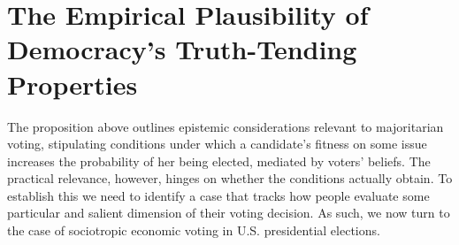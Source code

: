 \documentclass[11pt]{article}
\begin{document}
\section{The Empirical Plausibility of Democracy's Truth-Tending Properties}%
The proposition above outlines epistemic considerations relevant to majoritarian voting, stipulating conditions under which a candidate's fitness on some issue increases the probability of her being elected, mediated by voters' beliefs.
The practical relevance, however, hinges on whether the conditions actually obtain. To establish this we need to identify a case that tracks how people evaluate some particular and salient dimension of their voting decision. %
As such, we now turn to the case of sociotropic economic voting in U.S. presidential elections.
\end{document}
